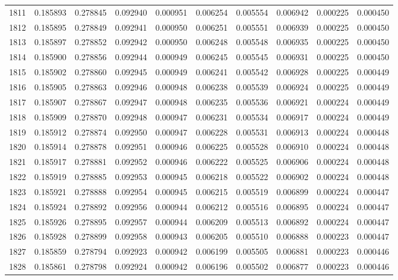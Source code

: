 \begin{tabular}{lrrrrrrrrr}
1811 & 0.185893 & 0.278845 & 0.092940 & 0.000951 & 0.006254 & 0.005554 & 0.006942 & 0.000225 & 0.000450 \\
1812 & 0.185895 & 0.278849 & 0.092941 & 0.000950 & 0.006251 & 0.005551 & 0.006939 & 0.000225 & 0.000450 \\
1813 & 0.185897 & 0.278852 & 0.092942 & 0.000950 & 0.006248 & 0.005548 & 0.006935 & 0.000225 & 0.000450 \\
1814 & 0.185900 & 0.278856 & 0.092944 & 0.000949 & 0.006245 & 0.005545 & 0.006931 & 0.000225 & 0.000450 \\
1815 & 0.185902 & 0.278860 & 0.092945 & 0.000949 & 0.006241 & 0.005542 & 0.006928 & 0.000225 & 0.000449 \\
1816 & 0.185905 & 0.278863 & 0.092946 & 0.000948 & 0.006238 & 0.005539 & 0.006924 & 0.000225 & 0.000449 \\
1817 & 0.185907 & 0.278867 & 0.092947 & 0.000948 & 0.006235 & 0.005536 & 0.006921 & 0.000224 & 0.000449 \\
1818 & 0.185909 & 0.278870 & 0.092948 & 0.000947 & 0.006231 & 0.005534 & 0.006917 & 0.000224 & 0.000449 \\
1819 & 0.185912 & 0.278874 & 0.092950 & 0.000947 & 0.006228 & 0.005531 & 0.006913 & 0.000224 & 0.000448 \\
1820 & 0.185914 & 0.278878 & 0.092951 & 0.000946 & 0.006225 & 0.005528 & 0.006910 & 0.000224 & 0.000448 \\
1821 & 0.185917 & 0.278881 & 0.092952 & 0.000946 & 0.006222 & 0.005525 & 0.006906 & 0.000224 & 0.000448 \\
1822 & 0.185919 & 0.278885 & 0.092953 & 0.000945 & 0.006218 & 0.005522 & 0.006902 & 0.000224 & 0.000448 \\
1823 & 0.185921 & 0.278888 & 0.092954 & 0.000945 & 0.006215 & 0.005519 & 0.006899 & 0.000224 & 0.000447 \\
1824 & 0.185924 & 0.278892 & 0.092956 & 0.000944 & 0.006212 & 0.005516 & 0.006895 & 0.000224 & 0.000447 \\
1825 & 0.185926 & 0.278895 & 0.092957 & 0.000944 & 0.006209 & 0.005513 & 0.006892 & 0.000224 & 0.000447 \\
1826 & 0.185928 & 0.278899 & 0.092958 & 0.000943 & 0.006205 & 0.005510 & 0.006888 & 0.000223 & 0.000447 \\
1827 & 0.185859 & 0.278794 & 0.092923 & 0.000942 & 0.006199 & 0.005505 & 0.006881 & 0.000223 & 0.000446 \\
1828 & 0.185861 & 0.278798 & 0.092924 & 0.000942 & 0.006196 & 0.005502 & 0.006877 & 0.000223 & 0.000446 \\

\end{tabular}
